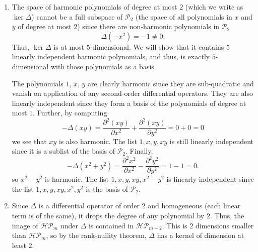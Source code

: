\documentclass[12 pt, letterpaper]{hmcpset}
\begin{document}
\begin{enumerate}
	\item The space of harmonic polynomials of degree at most $2$ (which we write as $\ker \Delta$) cannot be a full subspace of $\mathcal{P}_{2}$ (the space of all polynomials in $x$ and $y$ of degree at most $2$) since there are non-harmonic polynomials in $\mathcal{P}_{2}$
		\[
			\Delta(-x^{2}) = -1 \neq 0.
		\]
		Thus, $\ker \Delta$ is at most $5$-dimensional. We will show that it contains $5$ linearly independent harmonic polynomials, and thus, is exactly $5$-dimensional with those polynomials as a basis.

		The polynomials $1$, $x$, $y$ are clearly harmonic since they are sub-quadratic and vanish on application of any second-order differential operators. They are also linearly independent since they form a basis of the polynomials of degree at most $1$. Further, by computing
		\[
			- \Delta(xy) =  \frac{\partial^{2} (xy)}{\partial x^{2}} + \frac{\partial^{2} (xy)}{\partial y^{2}}= 0 + 0 = 0
		\]
		we see that $xy$ is also harmonic. The list $1, x, y, xy$ is still linearly independent since it is a sublist of the basis of $\mathcal{P}_{2}$. Finally,
		\[
			- \Delta(x^{2} + y^{2}) = \frac{\partial^{2} x^{2}}{\partial x^{2}} - \frac{\partial^{2} y^{2}}{\partial y^{2}} = 1 - 1 = 0.
		\]
		so $x^{2} - y^{2}$ is harmonic. The list $1, x, y, xy, x^{2} - y^{2}$ is linearly independent since the list $1, x, y, xy, x^{2}, y^{2}$ is the basis of $\mathcal{P}_{2}$.

	\item Since $\Delta$ is a differential operator of order $2$ and homogeneous (each linear term is of the same), it drops the degree of any polynomial by $2$. Thus, the image of $\mathcal{HP}_{m}$ under $\Delta$ is contained in $\mathcal{HP}_{m - 2}$. This is $2$ dimensions smaller than $\mathcal{HP}_{m}$, so by the rank-nullity theorem, $\Delta$ has a kernel of dimension at least $2$.
\end{enumerate}
\end{document}
